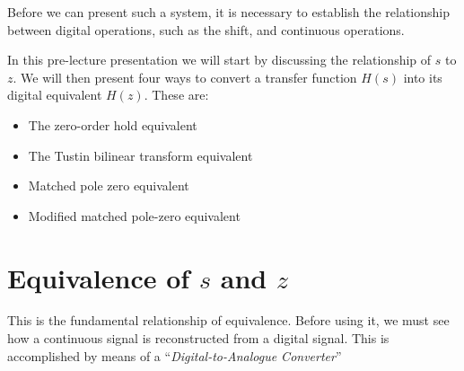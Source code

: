 \def\FileDate{98/12/02}
\def\FileVersion{1.0}

\ifslidesonly
\begin{slide}

\end{slide}
\fi


Before we can present such a system, it is necessary to establish the
relationship between digital operations, such as the shift, and
continuous operations.

\ifslidesonly
\begin{slide}
In this pre-lecture presentation we will start by discussing the relationship of $s$ to $z$.
We will then present four ways to convert a transfer function $H(s)$ into its
digital equivalent $H(z)$. These are:
\begin{itemize}
\item The zero-order hold equivalent
\item The Tustin bilinear transform equivalent
\item Matched pole zero equivalent
\item Modified matched pole-zero equivalent
\end{itemize}
\end{slide}
\fi

\section*{Equivalence of $s$ and $z$}

\ifslidesonly
\begin{slide}\label{slide:l11s1}

\end{slide}
\fi


\ifslidesonly
\begin{slide}\label{slide:l11s2}
  
\end{slide}
\fi


\ifslidesonly
\begin{slide}\label{zisexpmst}
  
\end{slide}
\fi


This is the fundamental relationship of equivalence. Before using it,
we must see how a continuous signal is reconstructed from a digital
signal. This is accomplished by means of a ``\emph{Digital-to-Analogue
Converter}''

